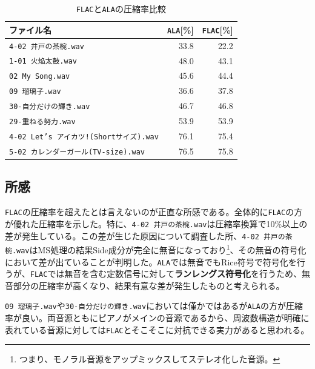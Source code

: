 \documentclass[uplatex,dvipdfmx,b5j,10pt]{jsbook}
\theoremstyle{definition}
\begin{document}
\begin{table}[htbp]
  \begin{center}
    \caption{\texttt{FLAC}と\texttt{ALA}の圧縮率比較} \label{compress_ratio_comp}
    \begin{tabular}{|l|r|r|}
      \hline
      ファイル名 & \texttt{ALA}[\%] & \texttt{FLAC}[\%] \\ \hline
      \texttt{4-02 井戸の茶椀.wav}                    & 33.8 & 22.2 \\ \hline
      \texttt{1-01 火焔太鼓.wav}                      & 48.0 & 43.1 \\ \hline
      \texttt{02 My Song.wav}                         & 45.6 & 44.4 \\ \hline
      \texttt{09 瑠璃子.wav}                          & 36.6 & 37.8 \\ \hline
      \texttt{30-自分だけの輝き.wav}                  & 46.7 & 46.8 \\ \hline
      \texttt{29-重ねる努力.wav}                      & 53.9 & 53.9 \\ \hline
      \texttt{4-02 Let's アイカツ!(Shortサイズ).wav}  & 76.1 & 75.4 \\ \hline
      \texttt{5-02 カレンダーガール(TV-size).wav}     & 76.5 & 75.8 \\ \hline
    \end{tabular}
  \end{center}
\end{table}

\subsection{所感}

\texttt{FLAC}の圧縮率を超えたとは言えないのが正直な所感である。全体的に\texttt{FLAC}の方が優れた圧縮率を示した。特に、\texttt{4-02 井戸の茶椀.wav}は圧縮率換算で10\%以上の差が発生している。この差が生じた原因について調査した所、\texttt{4-02 井戸の茶椀.wav}はMS処理の結果Side成分が完全に無音になっており\footnote{つまり、モノラル音源をアップミックスしてステレオ化した音源。}、その無音の符号化において差が出ていることが判明した。\texttt{ALA}では無音でもRice符号で符号化を行うが、\texttt{FLAC}では無音を含む定数信号に対して\textbf{ランレングス符号化}を行う\cite{flacformat}ため、無音部分の圧縮率が高くなり、結果有意な差が発生したものと考えられる。

\texttt{09 瑠璃子.wav}や\texttt{30-自分だけの輝き.wav}においては僅かではあるが\texttt{ALA}の方が圧縮率が良い。両音源ともにピアノがメインの音源であるから、周波数構造が明確に表れている音源に対しては\texttt{FLAC}とそこそこに対抗できる実力があると思われる。
\end{document}
